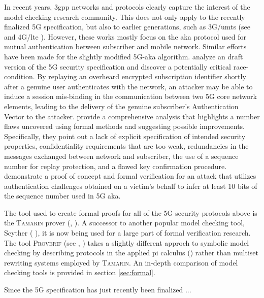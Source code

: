 In recent years, \gls{3gpp} networks and protocols clearly capture the interest of the model checking research community.
This does not only apply to the recently finalized 5G specification, but also to earlier generations, such as 3G/\gls{umts} (see~\cite{alt2016cryptographic} and 4G/\gls{lte} \cite{lee2014anonymity}).
However, these works mostly focus on the \gls{aka} protocol used for mutual authentication between subscriber and mobile network.
Similar efforts have been made for the slightly modified 5G-\gls{aka} algorithm.
\cite{dehnel2018security} analyze an draft version of the 5G security specification and discover a potentially critical race-condition.
By replaying an overheard encrypted subscription identifier shortly after a genuine user authenticates with the network, an attacker may be able to induce a session mis-binding in the communication between two 5G core network elements, leading to the delivery of the genuine subscriber's Authentication Vector to the attacker.
\cite{basin2018formal} provide a comprehensive analysis that highlights a number flaws uncovered using formal methods and suggesting possible improvements.
Specifically, they point out a lack of explicit specification of intended security properties, confidentiality requirements that are too weak, redundancies in the messages exchanged between network and subscriber, the use of a sequence number for replay protection, and a flawed key confirmation procedure.
\cite{borgaonkar2019new} demonstrate a proof of concept and formal verification for an attack that utilizes authentication challenges obtained on a victim's behalf to infer at least 10 bits of the sequence number used in 5G \gls{aka}.

The tool used to create formal proofs for all of the 5G security protocols above is the \textsc{Tamarin} prover (\cite{meier2013tamarin}, \cite{tamarin}).
A successor to another popular model checking tool, Scyther (\cite{cremers2008scyther} \cite{scyther}), it is now being used for a large part of formal verification research.
The tool \textsc{Proverif} (see \cite{blanchet2016modeling}, \cite{proverif}) takes a slightly different approch to symbolic model checking by describing protocols in the applied pi calculus (\cite{ryan2011applied}) rather than multiset rewriting systems employed by \textsc{Tamarin}.
An in-depth comparison of model checking tools is provided in section \ref{sec:formal}.

\cite{engel2008locating}
\cite{engel2014locate}
\cite{oliveira2014world}
\cite{puzankov2014how}

\cite{rao2015unblock}
\cite{rao2016privacy}
\cite{rao2016where}
\cite{holtmanns2016user}
\cite{holtmanns2017sms}

Since the 5G specification has just recently been finalized ... \cite{enisa2018signal}
